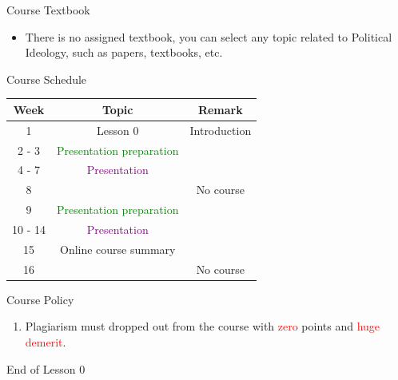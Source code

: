 \documentclass{beamer}
\begin{document}
\begin{frame}{Course Textbook}
\begin{itemize}
\item There is no assigned textbook, you can select any topic related to Political Ideology, such as papers, textbooks, etc. \\
\end{itemize}
\end{frame}
\begin{frame}{Course Schedule}
\begin{center}
\begin{tabular}{|c|c|c|}
\hline
Week & Topic & Remark \\
\hline
1 & Lesson 0 & Introduction\\
\hline
2 - 3 & \textcolor{Green}{Presentation preparation} & \\
\hline
4 - 7 & \textcolor{purple}{Presentation} & \\
\hline
8 & & No course \\
\hline
9 & \textcolor{Green}{Presentation preparation} & \\
\hline
10 - 14 & \textcolor{purple}{Presentation} & \\
\hline
15 & Online course summary & \\
\hline
16 & & No course \\
\hline
\end{tabular}
\end{center}
\end{frame}
\begin{frame}{Course Policy}
\begin{enumerate}
\item Plagiarism must dropped out from the course with \textcolor{red}{zero} points and \textcolor{red}{huge demerit}. \\
\end{enumerate}
\end{frame}
\begin{frame}{}
\begin{center}
\Large{End of Lesson 0}
\end{center}
\end{frame}
\end{document}
